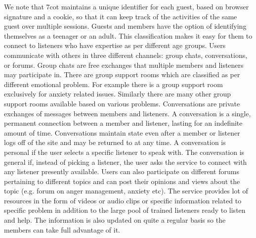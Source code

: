  We note that 7cot maintains a unique identifier for each guest, based on browser signature and a cookie, so that it can keep track of the activities of the same guest over multiple sessions. Guests and members have the option of identifying themselves as a teenager or an adult. This classification makes it easy for them to connect to listeners who have expertise as per different age groups.  Users communicate with others in three different channels: group chats, conversations, or forums. Group chats are free exchanges that multiple members and listeners may participate in. There are group support rooms which are classified as per different emotional problem. For example there is a group support room exclusively for anxiety related issues. Similarly there are many other group support rooms available based on various problems. Conversations are private exchanges of messages between members and listeners. A conversation is a single, permanent connection between a member and listener, lasting for an indefinite amount of time. Conversations maintain state even after a member or listener logs off of the site and may be returned to at any time. A conversation is personal if the user selects a specific listener to speak with. The conversation is general if, instead of picking a listener, the user asks the service to connect with any listener presently available. Users can also participate on different forums pertaining to different topics and can post their opinions and views about the topic (e.g. forum on anger management, anxiety etc). The service provides lot of resources in the form of videos or audio clips or specific information related to specific problem in addition to the large pool of trained listeners ready to listen and help. The information is also updated on quite a regular basis so the members can take full advantage of it. 

